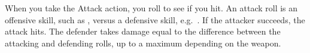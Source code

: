 
When you take the Attack action, you roll to see if you hit. An attack roll is an offensive skill, such as , versus a defensive skill, e.g.\ . If the attacker succeeds, the attack hits. The defender takes damage equal to the difference between the attacking and defending rolls, up to a maximum depending on the weapon.

